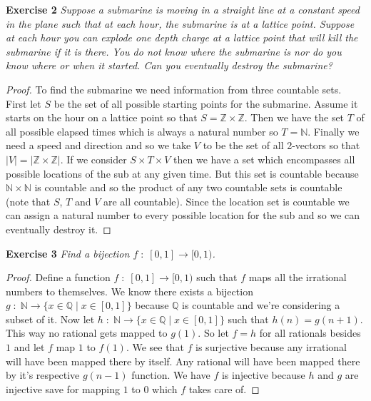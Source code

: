 \documentclass{article}
\begin{document}
\begin{flushleft}
\textbf{Exercise 2}
\textsl{Suppose a submarine is moving in a straight line at a constant speed in the plane such that at each hour, the submarine is at a lattice point. Suppose at each hour you can explode one depth charge at a lattice point that will kill the submarine if it is there. You do not know where the submarine is nor do you know where or when it started. Can you eventually destroy the submarine?}
\begin{proof}
To find the submarine we need information from three countable sets. First let $S$ be the set of all possible starting points for the submarine. Assume it starts on the hour on a lattice point so that $S=\mathbb{Z} \times \mathbb{Z}$. Then we have the set $T$ of all possible elapsed times which is always a natural number so $T = \mathbb{N}$. Finally we need a speed and direction and so we take $V$ to be the set of all 2-vectors so that $|V|=|\mathbb{Z} \times \mathbb{Z}|$. If we consider $S \times T \times V$ then we have a set which encompasses all possible locations of the sub at any given time. But this set is countable because $\mathbb{N} \times \mathbb{N}$ is countable and so the product of any two countable sets is countable (note that $S$, $T$ and $V$ are all countable). Since the location set is countable we can assign a natural number to every possible location for the sub and so we can eventually destroy it.
\end{proof}

\textbf{Exercise 3}
\textsl{Find a bijection $f \; : \; [0,1] \rightarrow [0,1)$.}
\begin{proof}
Define a function $f \; : \; [0,1] \rightarrow [0,1)$ such that $f$ maps all the irrational numbers to themselves. We know there exists a bijection $g \; : \; \mathbb{N} \rightarrow \{x \in \mathbb{Q} \mid x \in [0,1]\}$ because $\mathbb{Q}$ is countable and we're considering a subset of it. Now let $h \; : \; \mathbb{N} \rightarrow \{x \in \mathbb{Q} \mid x \in [0,1]\}$ such that $h(n)=g(n+1)$. This way no rational gets mapped to $g(1)$. So let $f=h$ for all rationals besides $1$ and let $f$ map $1$ to $f(1)$. We see that $f$ is surjective because any irrational will have been mapped there by itself. Any rational will have been mapped there by it's respective $g(n-1)$ function. We have $f$ is injective because $h$ and $g$ are injective save for mapping $1$ to $0$ which $f$ takes care of.
\end{proof}


\end{flushleft}
\end{document}
